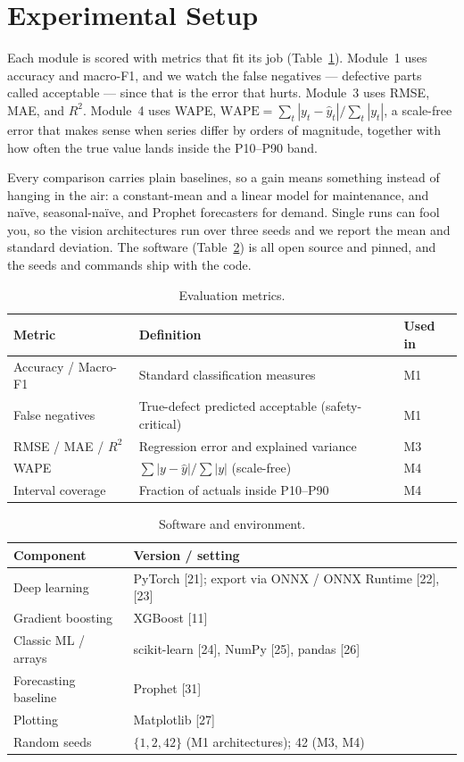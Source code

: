 \documentclass[12pt]{article}
\begin{document}
\section{Experimental Setup}
\label{sec:setup}

Each module is scored with metrics that fit its job (Table~\ref{tab:metrics}).
Module~1 uses accuracy and macro-F1, and we watch the false negatives --- defective
parts called acceptable --- since that is the error that hurts. Module~3 uses RMSE,
MAE, and $R^2$. Module~4 uses WAPE,
$\text{WAPE} = \sum_t |y_t - \hat{y}_t| \big/ \sum_t |y_t|$, a scale-free error that
makes sense when series differ by orders of magnitude, together with how often the
true value lands inside the P10--P90 band.

Every comparison carries plain baselines, so a gain means something instead of
hanging in the air: a constant-mean and a linear model for maintenance, and naïve,
seasonal-naïve, and Prophet forecasters for demand. Single runs can fool you, so the
vision architectures run over three seeds and we report the mean and standard
deviation. The software (Table~\ref{tab:env}) is all open source and pinned, and the
seeds and commands ship with the code.

\begin{table}[H]
\caption{Evaluation metrics.}
\label{tab:metrics}
\centering
\small
\begin{tabular}{@{}p{2.8cm}p{7.0cm}p{2.0cm}@{}}
\toprule
Metric & Definition & Used in \\
\midrule
Accuracy / Macro-F1 & Standard classification measures & M1 \\
False negatives & True-defect predicted acceptable (safety-critical) & M1 \\
RMSE / MAE / $R^2$ & Regression error and explained variance & M3 \\
WAPE & $\sum|y-\hat{y}| / \sum|y|$ (scale-free) & M4 \\
Interval coverage & Fraction of actuals inside P10--P90 & M4 \\
\bottomrule
\end{tabular}
\end{table}

\begin{table}[H]
\caption{Software and environment.}
\label{tab:env}
\centering
\small
\begin{tabular}{@{}p{4.2cm}p{8.0cm}@{}}
\toprule
Component & Version / setting \\
\midrule
Deep learning & PyTorch [21]; export via ONNX / ONNX Runtime [22], [23] \\
Gradient boosting & XGBoost [11] \\
Classic ML / arrays & scikit-learn [24], NumPy [25], pandas [26] \\
Forecasting baseline & Prophet [31] \\
Plotting & Matplotlib [27] \\
Random seeds & $\{1,2,42\}$ (M1 architectures); 42 (M3, M4) \\
\bottomrule
\end{tabular}
\end{table}
\end{document}
